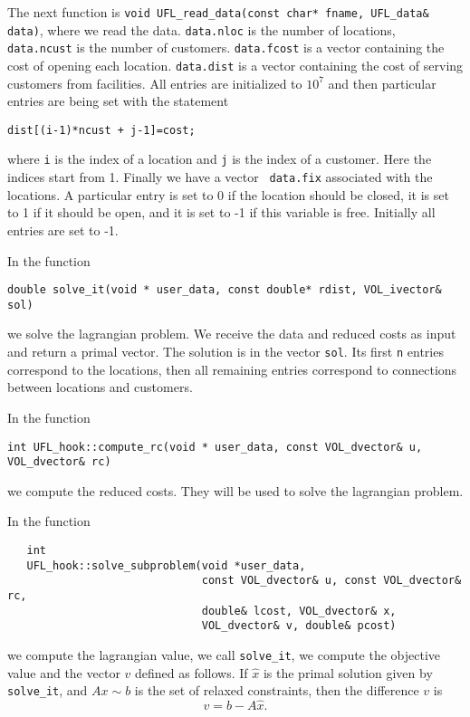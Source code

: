 \documentclass{article}
\begin{document}
The next function is {\tt void UFL\_read\_data(const char* fname, UFL\_data\&
data)}, where we read the data. {\tt data.nloc} is the number of locations,
{\tt data.ncust} is the number of customers. {\tt data.fcost} is a vector
containing the cost of opening each location. {\tt data.dist} is a vector
containing the cost of serving customers from facilities. All entries are
initialized to $10^7$ and then particular entries are being set with the
statement

{\tt dist[(i-1)*ncust + j-1]=cost;}

\noindent where {\tt i} is the index of a location and {\tt j} is the index
of a customer. Here the indices start from 1. Finally we have a vector {\tt
data.fix} associated with the locations. A particular entry is set to 0 if the
location should be closed, it is set to 1 if it should be open, and it is set
to -1 if this variable is free. Initially all entries are set to -1.

In the function 

{\tt double solve\_it(void * user\_data, const double* rdist, 
VOL\_ivector\& sol)}

\noindent we solve the lagrangian problem.
We receive the data and reduced costs as input and return a primal vector. The
solution is in the vector {\tt sol}. Its first {\tt n} entries correspond to
the locations, then all remaining entries correspond to connections between
locations and customers.

In the function 

{\tt int UFL\_hook::compute\_rc(void * user\_data, const VOL\_dvector\& u, 
VOL\_dvector\& rc)}

\noindent we compute the reduced costs. They will be used to solve the
lagrangian problem. 

In the function 

\begin{verbatim}
   int 
   UFL_hook::solve_subproblem(void *user_data, 
                              const VOL_dvector& u, const VOL_dvector& rc,
                              double& lcost, VOL_dvector& x, 
                              VOL_dvector& v, double& pcost)
\end{verbatim}

\noindent we compute the lagrangian value, we call {\tt solve\_it}, we compute
the objective value and the vector $v$ defined as follows. If $\hat x$ is the
primal solution given by {\tt solve\_it}, and $Ax \sim b$ is the set of
relaxed constraints, then the difference $v$ is $$v = b - A \hat x.$$
\end{document}
